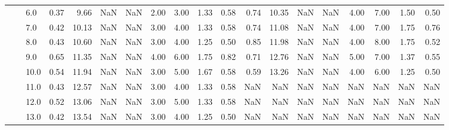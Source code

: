 \begin{tabular}{lllrrrrrrrrrrrrrrrr}
       &     & 6.0  &      0.37 &       9.66 &               NaN &                NaN & 2.00 &   3.00 &             1.33 &                         0.58 &      0.74 &      10.35 &               NaN &                NaN & 4.00 &   7.00 &             1.50 &                         0.50 \\
       &     & 7.0  &      0.42 &      10.13 &               NaN &                NaN & 3.00 &   4.00 &             1.33 &                         0.58 &      0.74 &      11.08 &               NaN &                NaN & 4.00 &   7.00 &             1.75 &                         0.76 \\
       &     & 8.0  &      0.43 &      10.60 &               NaN &                NaN & 3.00 &   4.00 &             1.25 &                         0.50 &      0.85 &      11.98 &               NaN &                NaN & 4.00 &   8.00 &             1.75 &                         0.52 \\
       &     & 9.0  &      0.65 &      11.35 &               NaN &                NaN & 4.00 &   6.00 &             1.75 &                         0.82 &      0.71 &      12.76 &               NaN &                NaN & 5.00 &   7.00 &             1.37 &                         0.55 \\
       &     & 10.0 &      0.54 &      11.94 &               NaN &                NaN & 3.00 &   5.00 &             1.67 &                         0.58 &      0.59 &      13.26 &               NaN &                NaN & 4.00 &   6.00 &             1.25 &                         0.50 \\
       &     & 11.0 &      0.43 &      12.57 &               NaN &                NaN & 3.00 &   4.00 &             1.33 &                         0.58 &       NaN &        NaN &               NaN &                NaN &  NaN &    NaN &              NaN &                          NaN \\
       &     & 12.0 &      0.52 &      13.06 &               NaN &                NaN & 3.00 &   5.00 &             1.33 &                         0.58 &       NaN &        NaN &               NaN &                NaN &  NaN &    NaN &              NaN &                          NaN \\
       &     & 13.0 &      0.42 &      13.54 &               NaN &                NaN & 3.00 &   4.00 &             1.25 &                         0.50 &       NaN &        NaN &               NaN &                NaN &  NaN &    NaN &              NaN &                          NaN \\

\end{tabular}
